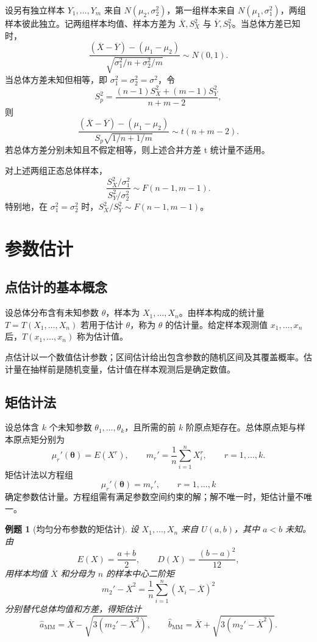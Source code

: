 \documentclass[11pt,a4paper,fontset=fandol]{ctexart}
\newtheorem{example}{例题}[section]
\theoremstyle{remark}
\begin{document}
设另有独立样本 $Y_1,\ldots,Y_m$ 来自 $N(\mu_2,\sigma_2^2)$，第一组样本来自 $N(\mu_1,\sigma_1^2)$，两组样本彼此独立。记两组样本均值、样本方差为 $\overline X,S_X^2$ 与 $\overline Y,S_Y^2$。当总体方差已知时，
\[
    \frac{(\overline X-\overline Y)-(\mu_1-\mu_2)}
    {\sqrt{\sigma_1^2/n+\sigma_2^2/m}}
    \sim N(0,1).
\]
当总体方差未知但相等，即 $\sigma_1^2=\sigma_2^2=\sigma^2$，令
\[
    S_p^2=\frac{(n-1)S_X^2+(m-1)S_Y^2}{n+m-2},
\]
则
\[
    \frac{(\overline X-\overline Y)-(\mu_1-\mu_2)}
    {S_p\sqrt{1/n+1/m}}
    \sim t(n+m-2).
\]
若总体方差分别未知且不假定相等，则上述合并方差 t 统计量不适用。

对上述两组正态总体样本，
\[
    \frac{S_X^2/\sigma_1^2}{S_Y^2/\sigma_2^2}
    \sim F(n-1,m-1).
\]
特别地，在 $\sigma_1^2=\sigma_2^2$ 时，$S_X^2/S_Y^2\sim F(n-1,m-1)$。

\clearpage
\section{参数估计}
\subsection{点估计的基本概念}
设总体分布含有未知参数 $\theta$，样本为 $X_1,\ldots,X_n$。由样本构成的统计量 $T=T(X_1,\ldots,X_n)$ 若用于估计 $\theta$，称为 $\theta$ 的估计量。给定样本观测值 $x_1,\ldots,x_n$ 后，$T(x_1,\ldots,x_n)$ 称为估计值。

点估计以一个数值估计参数；区间估计给出包含参数的随机区间及其覆盖概率。估计量在抽样前是随机变量，估计值在样本观测后是确定数值。

\subsection{矩估计法}
设总体含 $k$ 个未知参数 $\theta_1,\ldots,\theta_k$，且所需的前 $k$ 阶原点矩存在。总体原点矩与样本原点矩分别为
\[
    \mu_r'(\bm{\theta})=E(X^r),\qquad
    m_r'=\frac1n\sum_{i=1}^{n}X_i^r,\qquad r=1,\ldots,k.
\]
矩估计法以方程组
\[
    \mu_r'(\bm{\theta})=m_r',\qquad r=1,\ldots,k
\]
确定参数估计量。方程组需有满足参数空间约束的解；解不唯一时，矩估计量不唯一。

\begin{example}[均匀分布参数的矩估计]
设 $X_1,\ldots,X_n$ 来自 $U(a,b)$，其中 $a<b$ 未知。由
\[
    E(X)=\frac{a+b}{2},\qquad
    D(X)=\frac{(b-a)^2}{12},
\]
用样本均值 $\overline X$ 和分母为 $n$ 的样本中心二阶矩
\[
    m_2'-\overline X^2
    =\frac1n\sum_{i=1}^{n}(X_i-\overline X)^2
\]
分别替代总体均值和方差，得矩估计
\[
    \widehat a_{\mathrm{MM}}
    =\overline X-\sqrt{3(m_2'-\overline X^2)},\qquad
    \widehat b_{\mathrm{MM}}
    =\overline X+\sqrt{3(m_2'-\overline X^2)}.
\]
\end{example}
\end{document}
